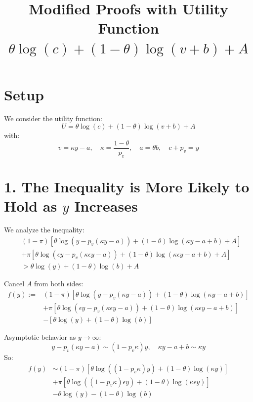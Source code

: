 \documentclass[11pt]{article}
\title{Modified Proofs with Utility Function $\theta \log(c) + (1-\theta)\log(v + b) + A$}
\date{}
\begin{document}
\maketitle

\section*{Setup}

We consider the utility function:
\[
U = \theta \log(c) + (1 - \theta) \log(v + b) + A
\]
with:
\[
v = \kappa y - a,\quad \kappa = \frac{1 - \theta}{p_v},\quad a = \theta b, \quad c+p_v=y
\]

\section*{1. The Inequality is More Likely to Hold as $y$ Increases}

We analyze the inequality:
\begin{align*}
& (1 - \pi)\left[\theta \log(y - p_v(\kappa y - a)) + (1 - \theta)\log(\kappa y - a + b) + A\right] \\
& + \pi\left[\theta \log(\epsilon y - p_v(\kappa \epsilon y - a)) + (1 - \theta)\log(\kappa \epsilon y - a + b) + A\right] \\
& > \theta \log(y) + (1 - \theta)\log(b) + A
\end{align*}

Cancel $A$ from both sides:
\begin{align*}
f(y) := & (1 - \pi)\left[\theta \log(y - p_v(\kappa y - a)) + (1 - \theta)\log(\kappa y - a + b)\right] \\
& + \pi\left[\theta \log(\epsilon y - p_v(\kappa \epsilon y - a)) + (1 - \theta)\log(\kappa \epsilon y - a + b)\right] \\
& - \left[\theta \log(y) + (1 - \theta)\log(b)\right]
\end{align*}

Asymptotic behavior as $y \to \infty$:
\[
y - p_v(\kappa y - a) \sim (1 - p_v \kappa)y,\quad \kappa y - a + b \sim \kappa y
\]
So:
\begin{align*}
f(y) & \sim (1 - \pi)\left[\theta \log((1 - p_v \kappa)y) + (1 - \theta)\log(\kappa y)\right] \\
& + \pi\left[\theta \log((1 - p_v \kappa)\epsilon y) + (1 - \theta)\log(\kappa \epsilon y)\right] \\
& - \theta \log(y) - (1 - \theta)\log(b)
\end{align*}
\end{document}
